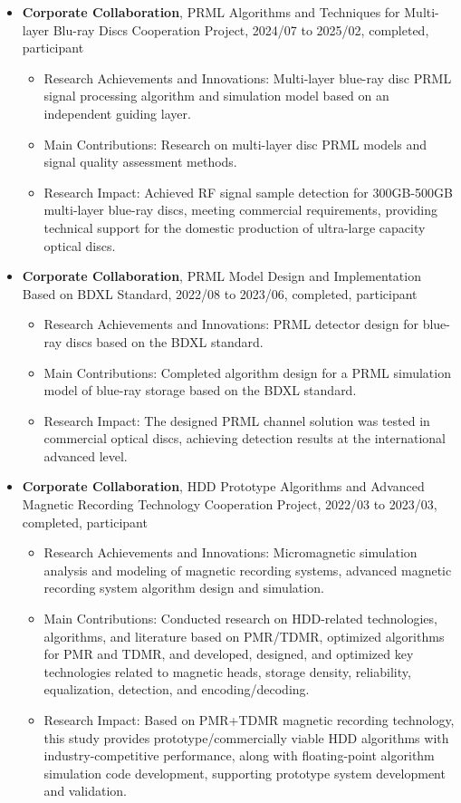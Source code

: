 \documentclass[en]{resume}
\begin{document}
\begin{itemize}
  \item \textbf{Corporate Collaboration}, PRML Algorithms and Techniques for Multi-layer Blu-ray Discs Cooperation Project, 2024/07 to 2025/02, completed, participant
  \begin{itemize}
    \item Research Achievements and Innovations: Multi-layer blue-ray disc PRML signal processing algorithm and simulation model based on an independent guiding layer.
    \item Main Contributions: Research on multi-layer disc PRML models and signal quality assessment methods.
    \item Research Impact: Achieved RF signal sample detection for 300GB-500GB multi-layer blue-ray discs, meeting commercial requirements, providing technical support for the domestic production of ultra-large capacity optical discs.
  \end{itemize}

  \item \textbf{Corporate Collaboration}, PRML Model Design and Implementation Based on BDXL Standard, 2022/08 to 2023/06, completed, participant
  \begin{itemize}
    \item Research Achievements and Innovations: PRML detector design for blue-ray discs based on the BDXL standard.
    \item Main Contributions: Completed algorithm design for a PRML simulation model of blue-ray storage based on the BDXL standard.
    \item Research Impact: The designed PRML channel solution was tested in commercial optical discs, achieving detection results at the international advanced level.
  \end{itemize}

  \item \textbf{Corporate Collaboration}, HDD Prototype Algorithms and Advanced Magnetic Recording Technology Cooperation Project, 2022/03 to 2023/03, completed, participant
  \begin{itemize}
    \item Research Achievements and Innovations: Micromagnetic simulation analysis and modeling of magnetic recording systems, advanced magnetic recording system algorithm design and simulation.
    \item Main Contributions: Conducted research on HDD-related technologies, algorithms, and literature based on PMR/TDMR, optimized algorithms for PMR and TDMR, and developed, designed, and optimized key technologies related to magnetic heads, storage density, reliability, equalization, detection, and encoding/decoding.
    \item Research Impact: Based on PMR+TDMR magnetic recording technology, this study provides prototype/commercially viable HDD algorithms with industry-competitive performance, along with floating-point algorithm simulation code development, supporting prototype system development and validation.
  \end{itemize}
\end{itemize}
\end{document}
